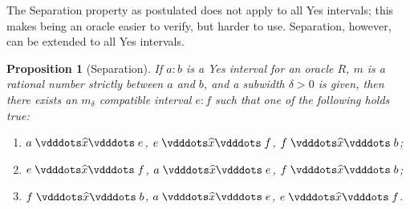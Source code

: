 \documentclass[12pt]{article}
\newtheorem{proposition}{Proposition}[section]
\begin{document}
The Separation property as postulated does not apply to all Yes intervals; this makes being an oracle easier to verify, but harder to use. Separation, however, can be extended to all Yes intervals.

\begin{proposition}[Separation]
    If $a: b$ is a Yes interval for an oracle $R$, $m$ is a rational number strictly between $a$ and $b$, and a subwidth $\delta > 0$ is given, then there exists an $m_\delta$ compatible interval $e:f$ such that one of the following holds true:
    \begin{enumerate}
        \item $a \xora e$, \sout{$e\xora f$}, \sout{$f\xora b$};
        \item $e \xora f$, \sout{$a\xora e$}, \sout{$f\xora b$};
        \item $f \xora b$, \sout{$a\xora e$}, \sout{$e\xora f$}.
    \end{enumerate}
\end{proposition}
\end{document}
